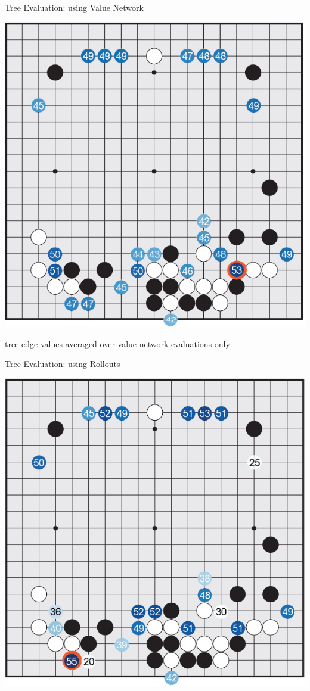 \documentclass{beamer}
\begin{document}
{    \begin{frame}{Tree Evaluation: using Value Network}
      \begin{center}
        \includegraphics[height=.82\textheight]{../img/tree_eval_from_value_network.png}

        \tiny
        tree-edge values averaged over value network evaluations only
      \end{center}
    \end{frame}

    \begin{frame}{Tree Evaluation: using Rollouts}
      \begin{center}
        \includegraphics[height=.82\textheight]{../img/tree_eval_from_rollouts.png}


\end{center}
\end{frame}}
\end{document}
